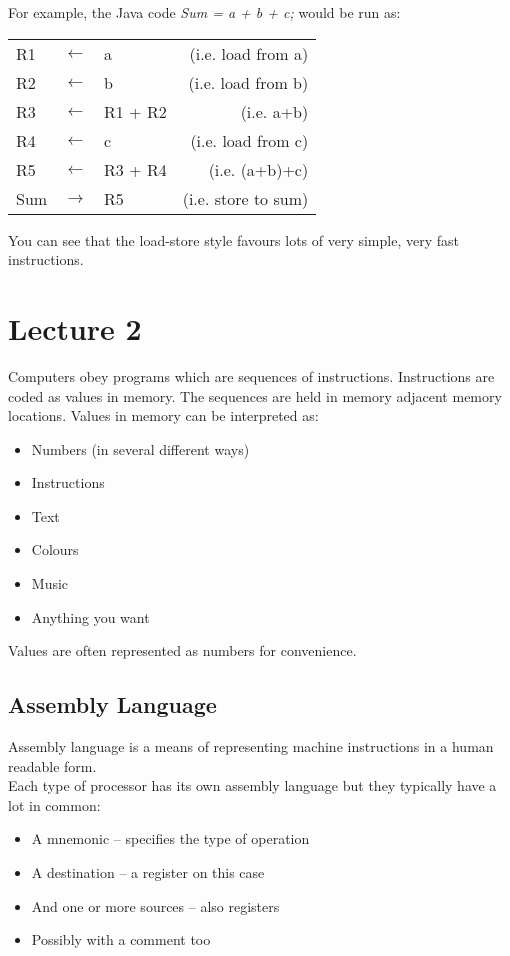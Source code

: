 \documentclass{article}
\begin{document}
For example, the Java code {\it Sum = a + b + c;} would be run as:

\begin{center}
    \begin{tabular}{l l l r}
        R1 & $\leftarrow$ & a & (i.e. load from a)\\
        R2 & $\leftarrow$ & b & (i.e. load from b)\\
        R3 & $\leftarrow$ & R1 + R2 & (i.e. a+b)\\
        R4 & $\leftarrow$ & c                      & (i.e. load from c)\\
        R5 & $\leftarrow$ & R3 + R4  & (i.e. (a+b)+c)\\
        Sum & $\rightarrow$ & R5 & (i.e. store to sum)\\
    \end{tabular}
\end{center}

You can see that the load-store style favours lots of very simple, very fast instructions.

\section{Lecture 2}
Computers obey programs which are sequences of instructions. Instructions are coded as values in memory. The sequences are held in memory adjacent memory locations. Values in memory can be interpreted as:
\begin{itemize}
	\item Numbers (in several different ways)
	\item Instructions
	\item Text
	\item Colours
	\item Music
	\item Anything you want
\end{itemize}
Values are often represented as numbers for convenience.

\subsection{Assembly Language}
Assembly language is a means of representing machine instructions in a human readable form.\\
Each type of processor has its own assembly language but they typically have a lot in common:
\begin{itemize}
	\item A mnemonic – specifies the type of operation
	\item A destination – a register on this case
	\item And one or more sources – also registers
	\item Possibly with a comment too
\end{itemize}
\end{document}
